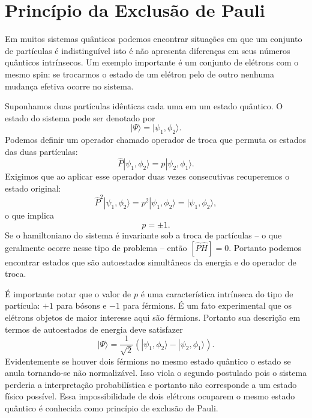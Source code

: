 \section{Princípio da Exclusão de Pauli}

Em muitos sistemas quânticos podemos encontrar situações em que um conjunto de partículas é indistinguível isto é não apresenta diferenças em seus números quânticos intrínsecos. Um exemplo importante é um conjunto de elétrons com o mesmo spin: se trocarmos o estado de um elétron pelo de outro nenhuma mudança efetiva ocorre no sistema.

Suponhamos duas partículas idênticas cada uma em um estado quântico. O estado do sistema pode ser denotado por
\begin{equation}
|\Psi\rangle = |\psi_1,\phi_2\rangle.
\end{equation}
Podemos definir um operador chamado operador de troca que permuta os estados das duas partículas:
\begin{equation}
\hat{P} |\psi_1,\phi_2\rangle = p|\psi_2,\phi_1\rangle.
\end{equation}
Exigimos que ao aplicar esse operador duas vezes consecutivas recuperemos o estado original:
\begin{equation}
\hat{P}^2 |\psi_1,\phi_2\rangle = p^2|\psi_1,\phi_2\rangle = |\psi_1,\phi_2 \rangle,
\end{equation}
o que implica
\begin{equation}
p = \pm 1.
\end{equation}
Se o hamiltoniano do sistema é invariante sob a troca de partículas – o que geralmente ocorre nesse tipo de problema – então $[\hat{P} \hat{H}] = 0$. Portanto podemos encontrar estados que são autoestados simultâneos da energia e do operador de troca.

É importante notar que o valor de $p$ é uma característica intrínseca do tipo de partícula: $+1$ para bósons e $-1$ para férmions. É um fato experimental que os elétrons objetos de maior interesse aqui são férmions. Portanto sua descrição em termos de autoestados de energia deve satisfazer
\begin{equation}
|\Psi\rangle = \frac{1}{\sqrt{2}} \left( |\psi_1,\phi_2\rangle - |\psi_2,\phi_1\rangle \right).
\end{equation}
Evidentemente se houver dois férmions no mesmo estado quântico o estado se anula tornando-se não normalizável. Isso viola o segundo postulado pois o sistema perderia a interpretação probabilística e portanto não corresponde a um estado físico possível. Essa impossibilidade de dois elétrons ocuparem o mesmo estado quântico é conhecida como princípio de exclusão de Pauli.

